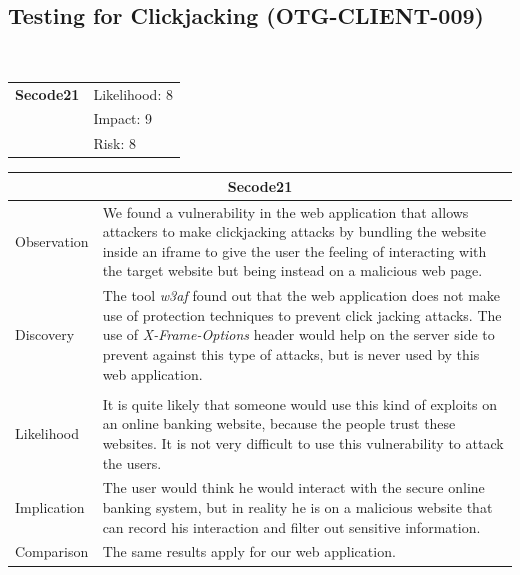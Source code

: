 \documentclass[headsepline,footsepline,footinclude=false,oneside,fontsize=11pt,paper=a4,listof=totoc,bibliography=totoc]{scrbook} %
\begin{document}
\subsection{Testing for Clickjacking (OTG-CLIENT-009)}\
\begin{tabular}{cR{12cm}}
	\textbf{Secode21} & Likelihood: 8\\& Impact: 9\\& Risk: 8
\end{tabular}

\begin{tabular}{ l|p{11cm}  }
	\hline
	\multicolumn{2}{c}{\textbf{Secode21}} \\
	\hline
	Observation   & We found a vulnerability in the web application that allows attackers to make clickjacking attacks by bundling the website inside an iframe to give the user the feeling of interacting with the target website but being instead on a malicious web page. \\

	Discovery  & The tool \textit{w3af} found out that the web application does not make use of protection techniques to prevent click jacking attacks. The use of \textit{X-Frame-Options} header would help on the server side to prevent against this type of attacks, but is never used by this web application. \\
	\\
	Likelihood & It is quite likely that someone would use this kind of exploits on an online banking website, because the people trust these websites. It is not very difficult to use this vulnerability to attack the users. \\
	Implication    & The user would think he would interact with the secure online banking system, but in reality he is on a malicious website that can record his interaction and filter out sensitive information. \\
	Comparison & The same results apply for our web application. \\
	\hline
\end{tabular}
\\
\vspace{0.5cm}
\\
\end{document}
